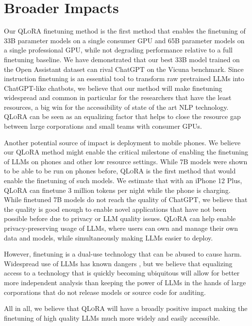 \section{Broader Impacts}

Our \textsc{QLoRA} finetuning method is the first method that enables the finetuning of 33B parameter models on a single consumer GPU and 65B parameter models on a single professional GPU, while not degrading performance relative to a full finetuning baseline. We have demonstrated that our best 33B model trained on the Open Assistant dataset can rival ChatGPT on the Vicuna benchmark. Since instruction finetuning is an essential tool to transform raw pretrained LLMs into ChatGPT-like chatbots, we believe that our method will make finetuning widespread and common in particular for the researchers that have the least resources, a big win for the accessibility of state of the art NLP technology. \textsc{QLoRA} can be seen as an equalizing factor that helps to close the resource gap between large corporations and small teams with consumer GPUs.

Another potential source of impact is deployment to mobile phones. We believe our \textsc{QLoRA} method might enable the critical milestone of enabling the finetuning of LLMs on phones and other low resource settings. While 7B models were shown to be able to be run on phones before, \textsc{QLoRA} is the first method that would enable the finetuning of such models. We estimate that with an iPhone 12 Plus, \textsc{QLoRA} can finetune 3 million tokens per night while the phone is charging. While finetuned 7B models do not reach the quality of ChatGPT, we believe that the quality is good enough to enable novel applications that have not been possible before due to privacy or LLM quality issues. \textsc{QLoRA} can help enable privacy-preserving usage of LLMs, where users can own and manage their own data and models, while simultaneously making LLMs easier to deploy.

However, finetuning is a dual-use technology that can be abused to cause harm. Widespread use of LLMs has known dangers \citep{bommasani2021opportunities,bender2021dangers}, but we believe that equalizing access to a technology that is quickly becoming ubiquitous will allow for better more independent analysis than keeping the power of LLMs in the hands of large corporations that do not release models or source code for auditing.

All in all, we believe that \textsc{QLoRA} will have a broadly positive impact making the finetuning of high quality LLMs much more widely and easily accessible.


